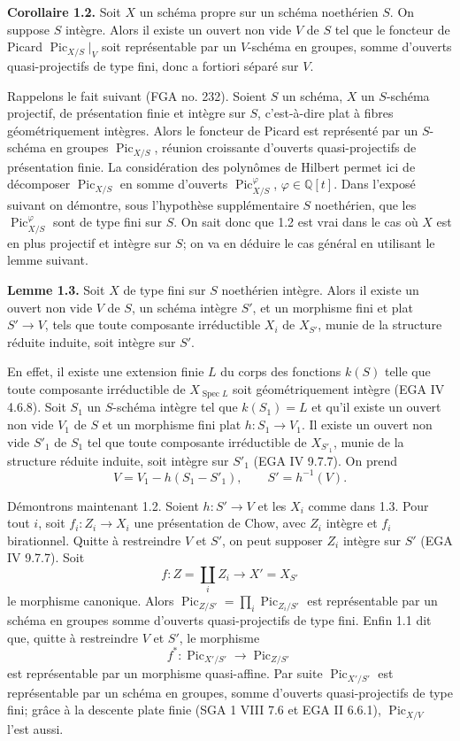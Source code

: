 \documentclass[11pt]{article}
\newcommand{\Spec}{\operatorname{Spec}}
\providecommand{\Pic}{\operatorname{Pic}}
\begin{document}
\textbf{Corollaire 1.2.} Soit \(X\) un schéma propre sur un schéma noethérien \(S\). On suppose \(S\) intègre. Alors il existe un ouvert non vide \(V\) de \(S\) tel que le foncteur de Picard \(\Pic_{X/S}|_V\) soit représentable par un \(V\)-schéma en groupes, somme d'ouverts quasi-projectifs de type fini, donc a fortiori séparé sur \(V\).

Rappelons le fait suivant (FGA no. 232). Soient \(S\) un schéma, \(X\) un \(S\)-schéma projectif, de présentation finie et intègre sur \(S\), c'est-à-dire plat à fibres géométriquement intègres. Alors le foncteur de Picard est représenté par un \(S\)-schéma en groupes \(\Pic_{X/S}\), réunion croissante d'ouverts quasi-projectifs de présentation finie. La considération des polynômes de Hilbert permet ici de décomposer \(\Pic_{X/S}\) en somme d'ouverts \(\Pic^\varphi_{X/S}\), \(\varphi\in\mathbb Q[t]\). Dans l'exposé suivant on démontre, sous l'hypothèse supplémentaire \(S\) noethérien, que les \(\Pic^\varphi_{X/S}\) sont de type fini sur \(S\). On sait donc que 1.2 est vrai dans le cas où \(X\) est en plus projectif et intègre sur \(S\); on va en déduire le cas général en utilisant le lemme suivant.

\textbf{Lemme 1.3.} Soit \(X\) de type fini sur \(S\) noethérien intègre. Alors il existe un ouvert non vide \(V\) de \(S\), un schéma intègre \(S'\), et un morphisme fini et plat \(S'\to V\), tels que toute composante irréductible \(X_i\) de \(X_{S'}\), munie de la structure réduite induite, soit intègre sur \(S'\).

En effet, il existe une extension finie \(L\) du corps des fonctions \(k(S)\) telle que toute composante irréductible de \(X_{\Spec L}\) soit géométriquement intègre (EGA IV 4.6.8). Soit \(S_1\) un \(S\)-schéma intègre tel que \(k(S_1)=L\) et qu'il existe un ouvert non vide \(V_1\) de \(S\) et un morphisme fini plat \(h:S_1\to V_1\). Il existe un ouvert non vide \(S'_1\) de \(S_1\) tel que toute composante irréductible de \(X_{S'_1}\), munie de la structure réduite induite, soit intègre sur \(S'_1\) (EGA IV 9.7.7). On prend
\[
  V=V_1-h(S_1-S'_1),\qquad S'=h^{-1}(V).
\]

Démontrons maintenant 1.2. Soient \(h:S'\to V\) et les \(X_i\) comme dans 1.3. Pour tout \(i\), soit \(f_i:Z_i\to X_i\) une présentation de Chow, avec \(Z_i\) intègre et \(f_i\) birationnel. Quitte à restreindre \(V\) et \(S'\), on peut supposer \(Z_i\) intègre sur \(S'\) (EGA IV 9.7.7). Soit
\[
  f:Z=\coprod_i Z_i\longrightarrow X'=X_{S'}
\]
le morphisme canonique. Alors \(\Pic_{Z/S'}=\prod_i\Pic_{Z_i/S'}\) est représentable par un schéma en groupes somme d'ouverts quasi-projectifs de type fini. Enfin 1.1 dit que, quitte à restreindre \(V\) et \(S'\), le morphisme
\[
  f^*:\Pic_{X'/S'}\longrightarrow \Pic_{Z/S'}
\]
est représentable par un morphisme quasi-affine. Par suite \(\Pic_{X'/S'}\) est représentable par un schéma en groupes, somme d'ouverts quasi-projectifs de type fini; grâce à la descente plate finie (SGA 1 VIII 7.6 et EGA II 6.6.1), \(\Pic_{X/V}\) l'est aussi.
\end{document}
